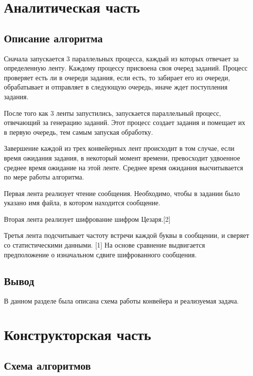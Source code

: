 \documentclass[12pt]{report}
\begin{document}
	\chapter{Аналитическая часть}
	
	\section{Описание алгоритма}
	
	Сначала запускается 3 параллельных процесса, каждый из которых отвечает за определенную ленту. Каждому процессу присвоена своя очеред заданий. Процесс проверяет есть ли в очереди задания, если есть, то забирает его из очереди, обрабатывает и отправляет в следующую очередь, иначе ждет поступления задания.
	
	После того как 3 ленты запустились, запускается параллельный процесс, отвечающий за генерацию заданий. Этот процесс создает задания и помещает их в первую очередь, тем самым запуская обработку.
	
	Завершение каждой из трех конвейерных лент происходит в том случае, если время ожидания задания, в некоторый момент времени, превосходит удвоенное среднее время ожидание на этой ленте. Среднее время ожидания высчитывается по мере работы алгоритма.
	
	Первая лента реализует чтение сообщения. Необходимо, чтобы в задании было указано имя файла, в котором находится сообщение.
	
	Вторая лента реализует шифрование шифром Цезаря.[2]
	
	Третья лента подсчитывает частоту встречи каждой буквы в сообщении, и сверяет со статистическими данными. [1]
	На основе сравнение выдвигается предположение о изначальном сдвиге шифрованного сообщения.


	\section*{Вывод}

	В данном разделе была описана схема работы конвейера и реализуемая задача.

	\chapter{Конструкторская часть}

	\section{Схема алгоритмов}
	
\end{document}

